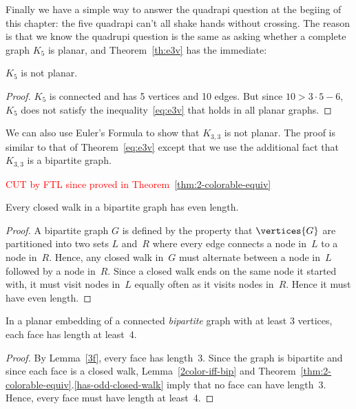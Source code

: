 Finally we have a simple way to answer the quadrapi question at the
begiing of this chapter: the five quadrapi can't all shake hands without
crossing.  The reason is that we know the quadrupi question is the same as
asking whether a complete graph $K_5$ is planar, and 
Theorem~\ref{th:e3v} has the immediate:
\begin{corollary}\label{k5not}
$K_5$ is not planar.
\end{corollary}
\begin{proof}
  $K_5$ is connected and has 5 vertices and 10 edges.  But since $10 > 3
  \cdot 5-6$, $K_5$ does not satisfy the inequality~\eqref{eq:e3v} that
  holds in all planar graphs.
\end{proof}

We can also use Euler's Formula to show that $K_{3, 3}$ is not
planar.  The proof is similar to that of Theorem~\ref{eq:e3v} except that
we use the additional fact that $K_{3, 3}$ is a bipartite graph.

\begin{editingnotes}
\textcolor{red}{CUT by FTL since proved in Theorem~\ref{thm:2-colorable-equiv}}

\begin{lemma*}\label{lem:5D5}
Every closed walk in a bipartite graph has even length.
\end{lemma*}

\begin{proof}
A bipartite graph $G$ is defined by the property that $\vertices{G}$
are partitioned into two sets $L$ and~$R$ where every edge
connects a node in~$L$ to a node in~$R$.  Hence, any closed walk
in~$G$ must alternate between a node in~$L$ followed by a node
in~$R$.  Since a closed walk ends on the same node it started with, it
must visit nodes in~$L$ equally often as it visits nodes in~$R$.
Hence it must have even length.
\end{proof}

\begin{corollary}\label{cor:5D6}
In a planar embedding of a connected \emph{bipartite} graph with at
least 3 vertices, each face has length at least~4.
\end{corollary}
\begin{proof}
  By Lemma~\ref{3f}, every face has length~3.  Since the graph is
  bipartite and since each face is a closed walk,
  Lemma~\ref{2color-iff-bip} and
  Theorem~\ref{thm:2-colorable-equiv}.\ref{has-odd-closed-walk} imply
    that no face can have length~3.  Hence, every face must have length at
    least~4.
\end{proof}
\end{editingnotes}

